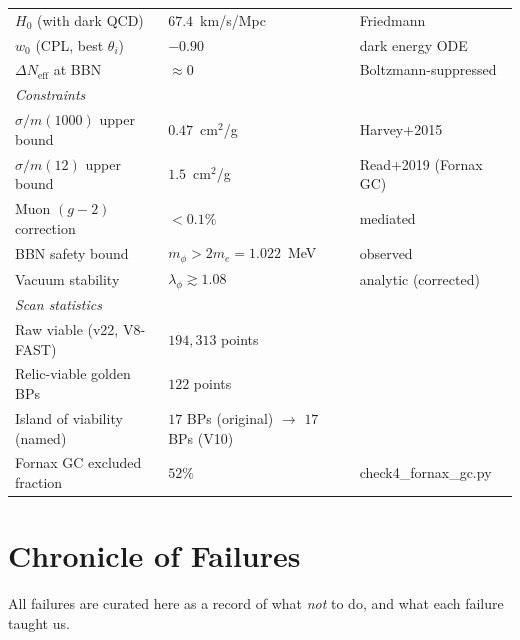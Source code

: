 \documentclass[12pt, a4paper]{article}
\begin{document}
\begin{center}
\begin{tabular}{lll}
  \hspace{1em}$H_0$ (with dark QCD) & $67.4$~km/s/Mpc & Friedmann \\
  \hspace{1em}$w_0$ (CPL, best $\theta_i$) & $-0.90$ & dark energy ODE \\
  \hspace{1em}$\Delta N_\text{eff}$ at BBN & $\approx 0$ & Boltzmann-suppressed \\
  \midrule
  \multicolumn{3}{l}{\textit{Constraints}} \\
  \hspace{1em}$\sigma/m(1000)$ upper bound & $0.47$~cm$^2$/g & Harvey+2015 \\
  \hspace{1em}$\sigma/m(12)$ upper bound & $1.5$~cm$^2$/g & Read+2019 (Fornax GC) \\
  \hspace{1em}Muon $(g-2)$ correction & $< 0.1\%$ & mediated \\
  \hspace{1em}BBN safety bound & $m_\phi > 2m_e = 1.022$~MeV & observed \\
  \hspace{1em}Vacuum stability & $\lambda_\phi \gtrsim 1.08$ & analytic (corrected) \\
  \midrule
  \multicolumn{3}{l}{\textit{Scan statistics}} \\
  \hspace{1em}Raw viable (v22, V8-FAST) & $194{,}313$ points & \\
  \hspace{1em}Relic-viable golden BPs & $122$ points & \\
  \hspace{1em}Island of viability (named) & $17$ BPs (original) $\to$ $17$ BPs (V10) & \\
  \hspace{1em}Fornax GC excluded fraction & $52\%$ & check4\_fornax\_gc.py \\
  \bottomrule
\end{tabular}
\end{center}

\section{Chronicle of Failures}

All failures are curated here as a record of what \emph{not} to do, and what each failure taught us.
\end{document}
